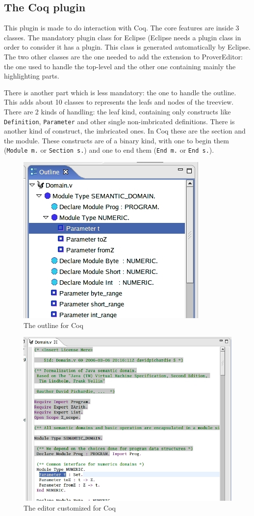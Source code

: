 \documentclass{llncs}
\begin{document}
\subsection{The Coq plugin}
\label{subsec:coq-plugin}

This plugin is made to do interaction with Coq. The core features
are inside 3 classes. The mandatory plugin class for Eclipse (Eclipse
needs a plugin class in order to consider it has a plugin. This class
is generated automatically by Eclipse. The two other classes are the one
needed to add the extension to ProverEditor: the one used to handle the
top-level and the other one containing mainly the highlighting parts.

There is another part which is less mandatory: the one to handle the outline.
This adds about 10 classes to represents the leafs and nodes of the treeview.
There are 2 kinds of handling: the leaf kind, containing only constructs
like {\tt Definition}, {\tt Parameter} and other single non-imbricated
definitions. There is another kind of construct, the imbricated ones.
In Coq these are the section and the module. These constructs are of
a binary kind, with one to begin them ({\tt Module m.} or {\tt Section s.})
and one to end them ({\tt End m.} or {\tt End s.}).\\

\begin{figure}
\begin{center}
\includegraphics[width=0.5\linewidth]{coqoutline}
\end{center}
  \caption{The outline for Coq}
  \label{outline}
\end{figure}
\begin{figure}
\begin{center}
\includegraphics[width=0.6\linewidth]{coqeditor}
\end{center}
  \caption{The editor customized for Coq}
  \label{editor}
\end{figure}
\end{document}
